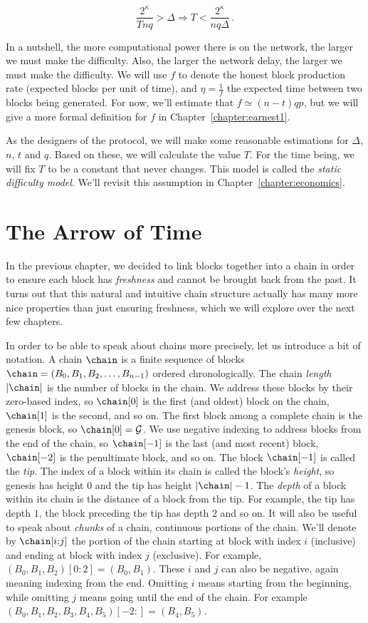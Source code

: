 \[
  \frac{2^\kappa}{Tnq} > \Delta \Rightarrow T < \frac{2^\kappa}{nq\Delta}\,.
\]

In a nutshell, the more computational power there is on the network, the larger we must make the difficulty.
Also, the larger the network delay, the larger we must make the difficulty.
We will use $f$ to denote the honest block production rate (expected blocks per unit of time),
and $\eta = \frac{1}{f}$ the expected time between two blocks being generated.
For now, we'll estimate that $f \simeq (n - t)qp$, but we will give a more
formal definition for $f$ in Chapter~\ref{chapter:earnest1}.

As the designers of the protocol, we will make some reasonable estimations for $\Delta$, $n$, $t$ and $q$.
Based on these, we will calculate the value $T$. For the time being, we will fix $T$ to be a constant
that never changes. This model is called the \emph{static difficulty model}. We'll revisit this assumption
in Chapter~\ref{chapter:economics}.

\section{The Arrow of Time}

In the previous chapter, we decided to link blocks together into a chain in order to ensure each block
has \emph{freshness} and cannot be brought back from the past. It turns out that this natural and
intuitive chain structure actually has many more nice properties than just ensuring freshness, which
we will explore over the next few chapters.

In order to be able to speak about chains more precisely,
let us introduce a bit of notation. A chain $\chain$ is a finite sequence of blocks
$\chain = (B_0, B_1, B_2, \ldots, B_{n-1})$ ordered chronologically.
The chain \emph{length} $|\chain|$ is the number of blocks in the chain.
We address these blocks by their zero-based index,
so $\chain[0]$ is the first (and oldest) block on the chain, $\chain[1]$ is the second, and so on.
The first block among a complete chain is the genesis block, so $\chain[0] = \mathcal{G}$.
We use negative indexing to address blocks from the end of the chain, so $\chain[-1]$
is the last (and most recent) block, $\chain[-2]$ is the penultimate block, and so on.
The block $\chain[-1]$ is called the \emph{tip}.
The index of a block within its chain is called the block's \emph{height},
so genesis has height $0$ and the tip has height $|\chain| - 1$.
The \emph{depth} of a block within its chain is the distance of a block
from the tip. For example, the tip has depth $1$, the block preceding the
tip has depth $2$ and so on.
It will also be useful to speak about \emph{chunks} of a chain, continuous portions
of the chain. We'll denote by $\chain[i{:}j]$ the portion of the chain starting at block
with index $i$ (inclusive) and ending at block with index $j$ (exclusive). For example,
$(B_0, B_1, B_2)[0:2] = (B_0, B_1)$. These $i$ and $j$ can also be negative, again meaning
indexing from the end. Omitting $i$ means starting from the beginning, while
omitting $j$ means going until the end of the chain. For example
$(B_0, B_1, B_2, B_3, B_4, B_5)[-2:] = (B_4, B_5)$.

